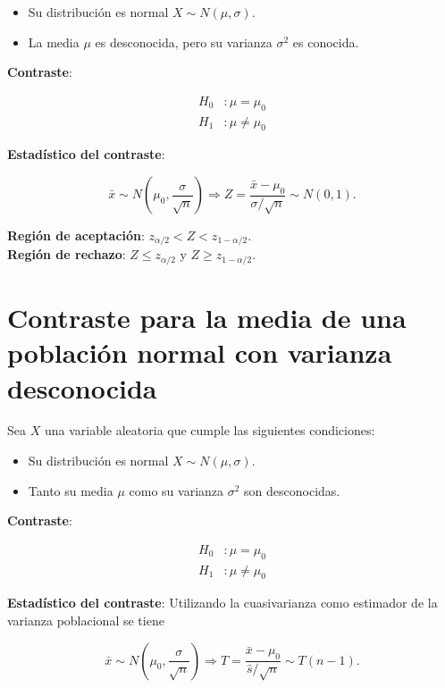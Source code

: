 \documentclass[
  a4paper,
]{scrreport}
\providecommand{\tightlist}{%
  \setlength{\itemsep}{0pt}\setlength{\parskip}{0pt}}\usepackage{longtable,booktabs,array}
\theoremstyle{definition}
\theoremstyle{definition}
\theoremstyle{plain}
\theoremstyle{remark}
\begin{document}
\begin{itemize}
\tightlist
\item
  Su distribución es normal \(X\sim N(\mu,\sigma)\).
\item
  La media \(\mu\) es desconocida, pero su varianza \(\sigma^2\) es
  conocida.
\end{itemize}

\textbf{Contraste}:

\[
\begin{aligned}
H_0 &: \mu=\mu_0 \\
H_1 &: \mu\neq \mu_0\end{aligned}
\]

\textbf{Estadístico del contraste}:

\[
\bar x\sim N\left(\mu_0,\frac{\sigma}{\sqrt{n}}\right) \Rightarrow Z=\frac{\bar x-\mu_0}{\sigma/\sqrt{n}}\sim N(0,1).
\]

\textbf{Región de aceptación}: \(z_{\alpha/2}< Z < z_{1-\alpha/2}\).\\
\textbf{Región de rechazo}: \(Z\leq z_{\alpha/2}\) y
\(Z\geq z_{1-\alpha/2}\).

\hypertarget{contraste-para-la-media-de-una-poblaciuxf3n-normal-con-varianza-desconocida}{%
\section{Contraste para la media de una población normal con varianza
desconocida}\label{contraste-para-la-media-de-una-poblaciuxf3n-normal-con-varianza-desconocida}}

Sea \(X\) una variable aleatoria que cumple las siguientes condiciones:

\begin{itemize}
\tightlist
\item
  Su distribución es normal \(X\sim N(\mu,\sigma)\).
\item
  Tanto su media \(\mu\) como su varianza \(\sigma^2\) son desconocidas.
\end{itemize}

\textbf{Contraste}:

\[
\begin{aligned}
H_0 &: \mu=\mu_0 \\
H_1 &: \mu\neq \mu_0\end{aligned}
\]

\textbf{Estadístico del contraste}: Utilizando la cuasivarianza como
estimador de la varianza poblacional se tiene

\[
\bar x\sim N\left(\mu_0,\frac{\sigma}{\sqrt{n}}\right) \Rightarrow T=\frac{\bar x-\mu_0}{\hat s/\sqrt{n}}\sim T(n-1).
\]
\end{document}
